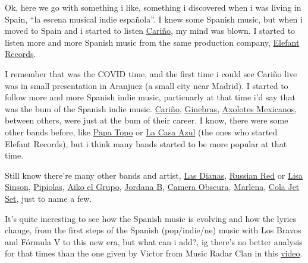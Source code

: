 
Ok, here we go with something i like, something i discovered when i was living
in Spain, ``la escena musical indie española''.  I knew some Spanish music, but
when i moved to Spain and i started to listen
\href{https://cariniopop.com}{Cariño}, my mind was blown. I started to listen
more and more Spanish music from the same production company,
\href{https://elefant.com/en/index}{Elefant Records}.

I remember that was the COVID time, and the first time i could see Cariño live
was in small presentation in Aranjuez (a small city near Madrid). I started to
follow more and more Spanish indie music, particuarly at that time i'd say that
was the bum of the Spanish indie music. \href{https://cariniopop.com}{Cariño},
\href{https://vananarecords.com/artist/ginebras/}{Ginebras},
\href{https://elefant.com/grupos/axolotes-mexicanos/biografia}{Axolotes
Mexicanos}, between others, were just at the bum of their career. I know, there
were some other bands before, like
\href{https://elefant.com/bands/papa-topo}{Papa Topo} or
\href{https://elefant.com/bands/la-casa-azul}{La Casa Azul} (the ones who
started Elefant Records), but i think many bands started to be more popular at
that time.

Still know there're many other bands and artist,
\href{https://whus.org/2023/03/meet-las-dianas-the-pop-punk-group-from-granada/}{Las
Dianas}, \href{https://russianred.com}{Russian Red} or
\href{https://elefant.com/grupos/lisasinson}{Lisa Sinson},
\href{https://elefant.com/grupos/pipiolas}{Pipiolas},
\href{https://elefant.com/grupos/aiko-el-grupo}{Aiko el Grupo},
\href{https://www.subterfuge.com/artistas/jordana-b/}{Jordana B},
\href{https://elefant.com/grupos/camera-obscura}{Camera Obscura},
\href{https://soundsfromspain.com/artista/marlena/?lang=en}{Marlena},
\href{https://elefant.com/grupos/cola-jet-set}{Cola Jet Set}, just to name a
few. 

It's quite ineresting to see how the Spanish music is evolving and how the
lyrics change, from the first steps of the Spanish (pop/indie/ne) music with
Los Bravos and Fórmula V to this new era, but what can i add?, ig there's no
better analysis for that times than the one given by Victor from Music Radar
Clan in this \href{https://www.youtube.com/watch?v=pODdVTfWOrQ}{video}.

